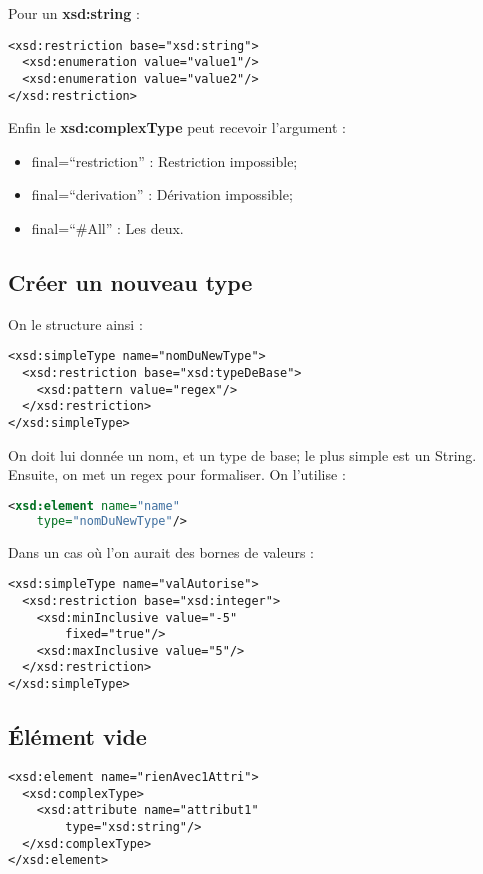             Pour un \textbf{xsd:string} :
            \begin{lstlisting}
<xsd:restriction base="xsd:string">
  <xsd:enumeration value="value1"/>
  <xsd:enumeration value="value2"/>
</xsd:restriction>
            \end{lstlisting}
            Enfin le \textbf{xsd:complexType} peut recevoir l'argument :
            \begin{itemize}
                \item final=``restriction'' : Restriction impossible;
                \item final=``derivation'' : Dérivation impossible;
                \item final=``\#All'' : Les deux.
            \end{itemize}

        \subsection{Créer un nouveau type}
            On le structure ainsi :
            \begin{lstlisting}
<xsd:simpleType name="nomDuNewType">
  <xsd:restriction base="xsd:typeDeBase">
    <xsd:pattern value="regex"/>
  </xsd:restriction>
</xsd:simpleType>
            \end{lstlisting}
            On doit lui donnée un nom, et un type de base; le plus simple est un String.\\
            Ensuite, on met un regex pour formaliser. On l'utilise :
            \begin{lstlisting}[language=XML]
<xsd:element name="name"
	type="nomDuNewType"/> 
            \end{lstlisting}
            Dans un cas où l'on aurait des bornes de valeurs :
            \begin{lstlisting}
<xsd:simpleType name="valAutorise">
  <xsd:restriction base="xsd:integer">
    <xsd:minInclusive value="-5"
        fixed="true"/>
    <xsd:maxInclusive value="5"/>
  </xsd:restriction>
</xsd:simpleType>
            \end{lstlisting}
        \subsection{Élément vide}
            \begin{lstlisting}
<xsd:element name="rienAvec1Attri">
  <xsd:complexType>
    <xsd:attribute name="attribut1"
        type="xsd:string"/>
  </xsd:complexType>
</xsd:element>
            \end{lstlisting}
